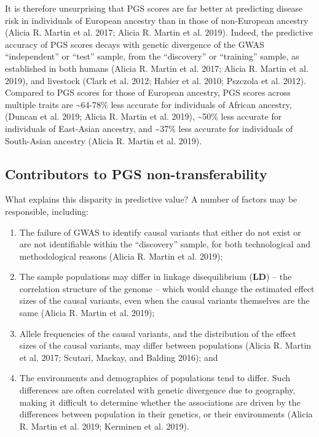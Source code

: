\documentclass[
]{book}
\begin{document}
It is therefore unsurprising that PGS scores are far better at predicting disease risk in individuals of European ancestry than in those of non-European ancestry (Alicia R. Martin et al. 2017; Alicia R. Martin et al. 2019). Indeed, the predictive accuracy of PGS scores decays with genetic divergence of the GWAS ``independent'' or ``test'' sample, from the ``discovery'' or ``training'' sample, as established in both humans (Alicia R. Martin et al. 2017; Alicia R. Martin et al. 2019), and livestock (Clark et al. 2012; Habier et al. 2010; Pszczola et al. 2012). Compared to PGS scores for those of European ancestry, PGS scores across multiple traits are \textasciitilde64-78\% less accurate for individuals of African ancestry, (Duncan et al. 2019; Alicia R. Martin et al. 2019), \textasciitilde50\% less accurate for individuals of East-Asian ancestry, and \textasciitilde37\% less accurate for individuals of South-Asian ancestry (Alicia R. Martin et al. 2019).

\hypertarget{contributors-to-pgs-non-transferability}{%
\subsection{Contributors to PGS non-transferability}\label{contributors-to-pgs-non-transferability}}

What explains this disparity in predictive value? A number of factors may be responsible, including:

\begin{enumerate}
\def\labelenumi{\arabic{enumi}.}
\item
  The failure of GWAS to identify causal variants that either do not exist or are not identifiable within the ``discovery'' sample, for both technological and methodological reasons (Alicia R. Martin et al. 2019);
\item
  The sample populations may differ in linkage disequilibrium (\textbf{LD}) -- the correlation structure of the genome -- which would change the estimated effect sizes of the causal variants, even when the causal variants themselves are the same (Alicia R. Martin et al. 2019);
\item
  Allele frequencies of the causal variants, and the distribution of the effect sizes of the causal variants, may differ between populations (Alicia R. Martin et al. 2017; Scutari, Mackay, and Balding 2016); and
\item
  The environments and demographies of populations tend to differ. Such differences are often correlated with genetic divergence due to geography, making it difficult to determine whether the associations are driven by the differences between population in their genetics, or their environments (Alicia R. Martin et al. 2019; Kerminen et al. 2019).
\end{enumerate}
\end{document}
